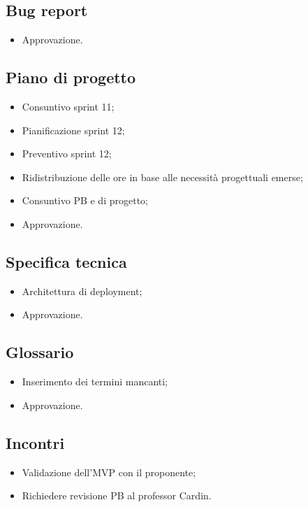 \subsection{Bug report}
\begin{itemize}
    \item Approvazione.
\end{itemize}

\subsection{Piano di progetto}
\begin{itemize}
    \item Consuntivo sprint 11;
    \item Pianificazione sprint 12;
    \item Preventivo sprint 12;
    \item Ridistribuzione delle ore in base alle necessità progettuali emerse;
    \item Consuntivo PB e di progetto;
    \item Approvazione.
\end{itemize}

\subsection{Specifica tecnica}
\begin{itemize}
    \item Architettura di deployment;
    \item Approvazione.
\end{itemize}

\subsection{Glossario}
\begin{itemize}
    \item Inserimento dei termini mancanti;
    \item Approvazione.
\end{itemize}

\subsection{Incontri}
\begin{itemize}
    \item Validazione dell'MVP con il proponente;
    \item Richiedere revisione PB al professor Cardin.
\end{itemize}
